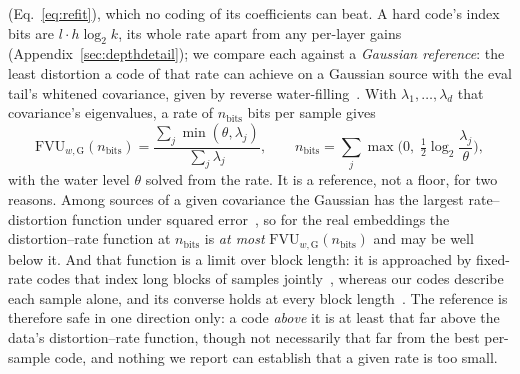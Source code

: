 (Eq.~\eqref{eq:refit}), which no coding of its coefficients can beat. A
hard code's index bits are $l\cdot h\log_2 k$, its whole rate apart from
any per-layer gains (Appendix~\ref{sec:depthdetail}); we compare
each against a \emph{Gaussian reference}: the least distortion a code of
that rate can achieve on a Gaussian source with the eval tail's whitened
covariance, given by reverse water-filling~\cite[Thm.~10.3.3]{cover2006}. With
$\lambda_1, \dots, \lambda_d$ that covariance's eigenvalues, a rate of
$n_{\mathrm{bits}}$ bits per sample gives
\begin{equation}
	\mathrm{FVU}_{w,\mathrm{G}}(n_{\mathrm{bits}}) = \frac{\sum_j \min(\theta, \lambda_j)}{\sum_j \lambda_j},
	\qquad
	n_{\mathrm{bits}} = \sum_j \max\!\Big(0,\; \tfrac{1}{2}\log_2 \frac{\lambda_j}{\theta}\Big),
	\label{eq:ratefloor}
\end{equation}
with the water level $\theta$ solved from the rate. It is a reference, not
a floor, for two reasons. Among sources of a given covariance the Gaussian
has the largest rate--distortion function under squared
error~\cite[Problem~10.8]{cover2006}, so for the real embeddings the
distortion--rate function at $n_{\mathrm{bits}}$ is \emph{at most}
$\mathrm{FVU}_{w,\mathrm{G}}(n_{\mathrm{bits}})$ and may be well below
it. And that function is a limit over block length: it is approached by
fixed-rate codes that index long blocks of samples
jointly~\cite[Sec.~10.5]{cover2006}, whereas our codes describe each
sample alone, and its converse holds at every block
length~\cite[Sec.~10.4]{cover2006}. The reference is therefore safe in one
direction only: a code \emph{above} it is at least that far above the
data's distortion--rate function, though not necessarily that far from
the best per-sample code, and nothing we report can establish that a
given rate is too small.

